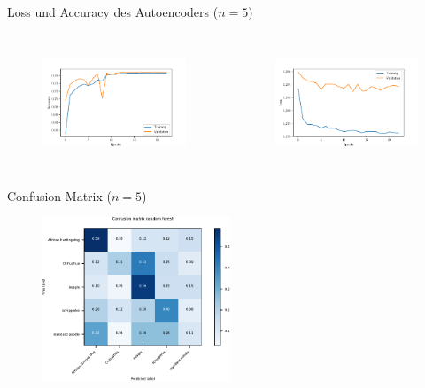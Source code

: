   \begin{frame}{Loss und Accuracy des Autoencoders ($n = 5$)}
    \begin{columns}[c]
      \begin{figure}
        \centering
        \includegraphics[width=\textwidth]{logos/RF/history_acc_rf.pdf}
        \label{fig:acc_rf}
      \end{figure}
      \begin{figure}
        \centering
        \includegraphics[width=\textwidth]{logos/RF/history_loss_rf.pdf}
        \label{fig:loss_rf}
      \end{figure}
    \end{columns}
  \end{frame}

  \begin{frame}{Confusion-Matrix ($n = 5$)}
    \begin{figure}
      \centering
      \includegraphics[width=0.5\textwidth]{logos/RF/confusion_matrix_rf.pdf}
      \label{fig:cm_rf}
    \end{figure}
  \end{frame}


